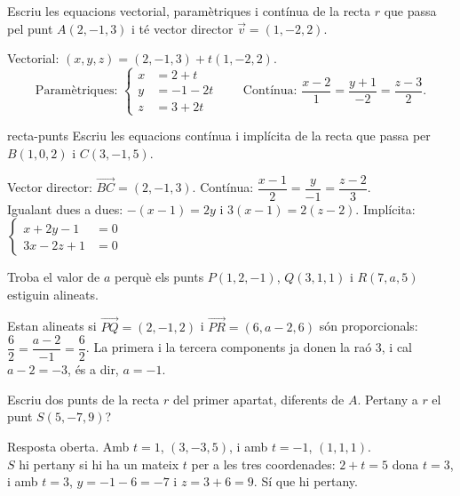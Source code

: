 \begin{apartats}

Escriu les equacions vectorial, paramètriques i contínua de la recta $r$ que passa pel punt $A(2,-1,3)$
i té vector director $\vec v=(1,-2,2)$.

\begin{solucio}
Vectorial: $(x,y,z)=(2,-1,3)+t(1,-2,2)$.
\[
\text{Paramètriques: }\left\{\begin{aligned}x&=2+t\\y&=-1-2t\\z&=3+2t\end{aligned}\right.
\qquad
\text{Contínua: }\frac{x-2}{1}=\frac{y+1}{-2}=\frac{z-3}{2}.
\]
\end{solucio}

\begin{tria}{recta-punts}
Escriu les equacions contínua i implícita de la recta que passa per $B(1,0,2)$ i $C(3,-1,5)$.

\begin{solucio}
Vector director: $\overrightarrow{BC}=(2,-1,3)$. Contínua: $\dfrac{x-1}{2}=\dfrac{y}{-1}=\dfrac{z-2}{3}$.\\
Igualant dues a dues: $-(x-1)=2y$ i $3(x-1)=2(z-2)$. Implícita:
$\left\{\begin{aligned}x+2y-1&=0\\3x-2z+1&=0\end{aligned}\right.$
\end{solucio}

Troba el valor de $a$ perquè els punts $P(1,2,-1)$, $Q(3,1,1)$ i $R(7,a,5)$ estiguin alineats.

\begin{solucio}
Estan alineats si $\overrightarrow{PQ}=(2,-1,2)$ i $\overrightarrow{PR}=(6,a-2,6)$ són proporcionals:
$\dfrac62=\dfrac{a-2}{-1}=\dfrac62$. La primera i la tercera components ja donen la raó 3, i cal
$a-2=-3$, és a dir, $a=-1$.
\end{solucio}
\end{tria}

\begin{nomesllarg}
Escriu dos punts de la recta $r$ del primer apartat, diferents de $A$. Pertany a $r$ el punt $S(5,-7,9)$?

\begin{solucio}
Resposta oberta. Amb $t=1$, $(3,-3,5)$, i amb $t=-1$, $(1,1,1)$.\\
$S$ hi pertany si hi ha un mateix $t$ per a les tres coordenades: $2+t=5$ dona $t=3$, i amb $t=3$,
$y=-1-6=-7$ i $z=3+6=9$. Sí que hi pertany.
\end{solucio}
\end{nomesllarg}

\end{apartats}
